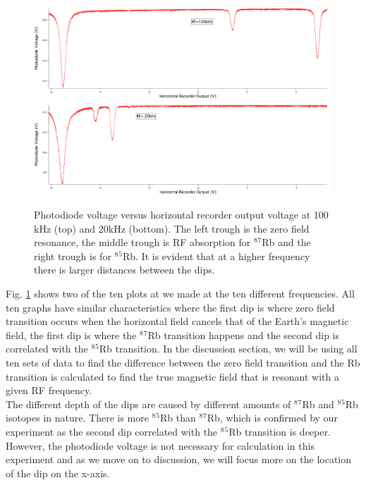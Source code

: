 \documentclass[prb,preprint]{revtex4-1}
\begin{document}
\begin{figure}[h!!!!!!!!]
\centering
\includegraphics[width=15cm]{100k.png}
\includegraphics[width=15cm]{20k.png}
\caption{Photodiode voltage versus horizontal recorder output voltage at 100 kHz (top) and 20kHz (bottom). The left trough is the zero field resonance, the middle trough is RF absorption for $^8$$^7$Rb and the right trough is for $^8$$^5$Rb. It is evident that at a higher frequency there is larger  distances between the dips.}
\label{100kHz}
\end{figure}


Fig. \ref{100kHz} shows two of the ten plots at we made at the ten different frequencies. All ten graphs have similar characteristics where the first dip is where zero field transition occurs when the horizontal field cancels that of the Earth's magnetic field, the first dip is where the  $^8$$^7$Rb transition happens and the second dip is correlated with the $^8$$^5$Rb transition. In the discussion section, we will be using all ten sets of data to find the difference between the zero field transition and the Rb transition is calculated to find the true magnetic field that is resonant with a given RF frequency.\\

The different depth of the dips are caused by different amounts of $^8$$^7$Rb and $^8$$^5$Rb isotopes in nature. There is more $^8$$^5$Rb than $^8$$^7$Rb, which is confirmed by our experiment as the second dip correlated with the  $^8$$^5$Rb transition is deeper. However, the photodiode voltage is not necessary for calculation in this experiment and as we move on to discussion, we will focus more on the location of the dip on the x-axis.\\
\end{document}
